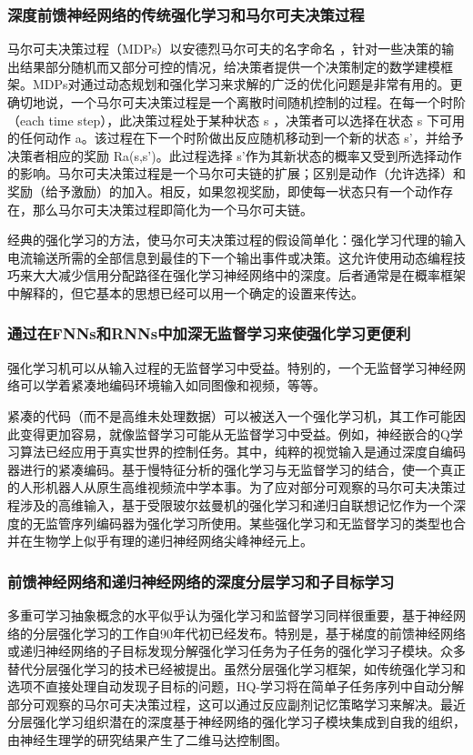 \documentclass[10pt,journal,compsoc]{IEEEtran}
\begin{document}
\subsubsection{深度前馈神经网络的传统强化学习和马尔可夫决策过程}
马尔可夫决策过程（MDPs）以安德烈马尔可夫的名字命名 ，针对一些决策的输出结果部分随机而又部分可控的情况，给决策者提供一个决策制定的数学建模框架。MDPs对通过动态规划和强化学习来求解的广泛的优化问题是非常有用的。更确切地说，一个马尔可夫决策过程是一个离散时间随机控制的过程。在每一个时阶（each time step），此决策过程处于某种状态 s ，决策者可以选择在状态 s 下可用的任何动作 a。该过程在下一个时阶做出反应随机移动到一个新的状态 s'，并给予决策者相应的奖励 Ra(s,s')。此过程选择 s'作为其新状态的概率又受到所选择动作的影响。马尔可夫决策过程是一个马尔可夫链的扩展；区别是动作（允许选择）和奖励（给予激励）的加入。相反，如果忽视奖励，即使每一状态只有一个动作存在，那么马尔可夫决策过程即简化为一个马尔可夫链。\par
经典的强化学习的方法，使马尔可夫决策过程的假设简单化：强化学习代理的输入电流输送所需的全部信息到最佳的下一个输出事件或决策。这允许使用动态编程技巧来大大减少信用分配路径在强化学习神经网络中的深度。后者通常是在概率框架中解释的，但它基本的思想已经可以用一个确定的设置来传达。\par

\subsubsection{通过在FNNs和RNNs中加深无监督学习来使强化学习更便利}
强化学习机可以从输入过程的无监督学习中受益。特别的，一个无监督学习神经网络可以学着紧凑地编码环境输入如同图像和视频，等等。\par
紧凑的代码（而不是高维未处理数据）可以被送入一个强化学习机，其工作可能因此变得更加容易，就像监督学习可能从无监督学习中受益。例如，神经嵌合的Q学习算法已经应用于真实世界的控制任务。其中，纯粹的视觉输入是通过深度自编码器进行的紧凑编码。基于慢特征分析的强化学习与无监督学习的结合，使一个真正的人形机器人从原生高维视频流中学本事。为了应对部分可观察的马尔可夫决策过程涉及的高维输入，基于受限玻尔兹曼机的强化学习和递归自联想记忆作为一个深度的无监管序列编码器为强化学习所使用。某些强化学习和无监督学习的类型也合并在生物学上似乎有理的递归神经网络尖峰神经元上。
\subsubsection{前馈神经网络和递归神经网络的深度分层学习和子目标学习}
多重可学习抽象概念的水平似乎认为强化学习和监督学习同样很重要，基于神经网络的分层强化学习的工作自90年代初已经发布。特别是，基于梯度的前馈神经网络或递归神经网络的子目标发现分解强化学习任务为子任务的强化学习子模块。众多替代分层强化学习的技术已经被提出。虽然分层强化学习框架，如传统强化学习和选项不直接处理自动发现子目标的问题，HQ-学习将在简单子任务序列中自动分解部分可观察的马尔可夫决策过程，这可以通过反应副剂记忆策略学习来解决。最近分层强化学习组织潜在的深度基于神经网络的强化学习子模块集成到自我的组织，由神经生理学的研究结果产生了二维马达控制图。
\end{document}
